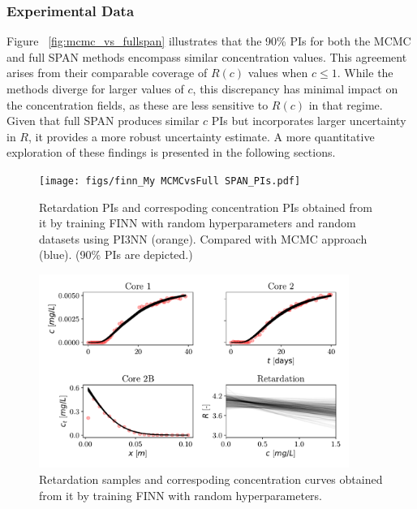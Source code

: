 \subsubsection{Experimental Data}

Figure ~\vref{fig:mcmc_vs_fullspan} illustrates that the 90\% PIs for both the MCMC and full SPAN methods encompass similar concentration values. This agreement arises from their comparable coverage of $R(c)$ values when $c \leq 1$. While the methods diverge for larger values of $c$, this discrepancy has minimal impact on the concentration fields, as these are less sensitive to $R(c)$ in that regime. Given that full SPAN produces similar $c$ PIs but incorporates larger uncertainty in $R$, it provides a more robust uncertainty estimate. A more quantitative exploration of these findings is presented in the following sections.


\begin{figure}
    \centering
    \texttt{[image: figs/finn\_My MCMCvsFull SPAN\_PIs.pdf]}
    \caption{Retardation PIs and correspoding concentration PIs obtained from it by training FINN with random hyperparameters and random datasets using PI3NN (orange). Compared with MCMC approach (blue). (90\% PIs are depicted.)}
    \label{fig:mcmc_vs_fullspan}
\end{figure}


\begin{figure}
    \centering
    \includegraphics[width=0.9\textwidth]{figs/finn_span_samples.pdf}
    \caption{Retardation samples and correspoding concentration curves obtained from it by training FINN with random hyperparameters.}
    \label{fig:span_samples}
\end{figure}

